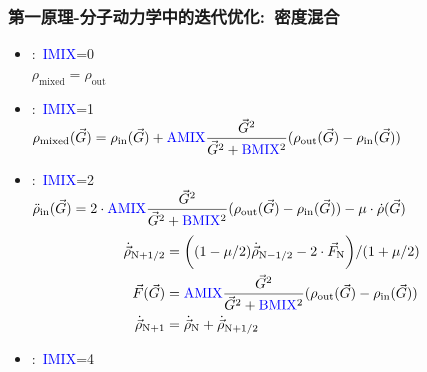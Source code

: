 \documentclass[cjk,slidestop,compress,mathserif,blue]{beamer}
\begin{document}
   \frame
   {
	   \frametitle{第一原理-分子动力学中的迭代优化:~密度混合}
	\begin{itemize}
		   \item {}:~\textcolor{blue}{IMIX}=0\\
			   $\rho_{\mathrm{mixed}}=\rho_{\mathrm{out}}$
		   \item {}:~\textcolor{blue}{IMIX}=1\\
			   $\rho_{\mathrm{mixed}}(\vec G)=\rho_{\mathrm{in}}(\vec G)+\textcolor{blue}{\mathrm{AMIX}}\dfrac{\vec G^2}{\vec G^2+\textcolor{blue}{\mathrm{BMIX}}^2}(\rho_{\mathrm{out}}(\vec G)-\rho_{\mathrm{in}}(\vec G))$ 
		   \item {}:~\textcolor{blue}{IMIX}=2\\
			   $\ddot{\rho}_{\mathrm{in}}(\vec G)=2\cdot\textcolor{blue}{\mathrm{AMIX}}\dfrac{\vec G^2}{\vec G^2+\textcolor{blue}{\mathrm{BMIX}}^2}(\rho_{\mathrm{out}}(\vec G)-\rho_{\mathrm{in}}(\vec G))-\mu\cdot\dot{\rho}(\vec G)$
			\begin{displaymath}
				\begin{aligned}
					\dot{\vec\rho}_{\mathrm{N+1/2}}&=\bigg((1-\mu/2)\dot{\vec\rho}_{\mathrm{N}-1/2}-2\cdot\vec F_{\mathrm{N}}\bigg)/(1+\mu/2)\\
					\vec F(\vec G)&=\textcolor{blue}{\mathrm{AMIX}}\dfrac{\vec G^2}{\vec G^2+\textcolor{blue}{\mathrm{BMIX}}^2}(\rho_{\mathrm{out}}(\vec G)-\rho_{\mathrm{in}}(\vec G))\\
					\dot{\vec\rho}_{\mathrm{N+1}}&=\dot{\vec\rho}_{\mathrm{N}}+\dot{\vec\rho}_{\mathrm{N}+1/2}
				\end{aligned}
			\end{displaymath}
		   \item {}:~\textcolor{blue}{IMIX}=4\\
	\end{itemize}
   }
\end{document}
